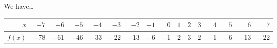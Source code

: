 \documentclass[11pt,letterpaper]{article}
\begin{document}
\sol We have\dots \par
	\begin{table}[!ht]
	\centering
	\begin{tabular}{r||rrrrrrrrrrrrrrr}
	$x$ & $-7$ & $-6$ & $-5$ & $-4$ & $-3$ & $-2$ & $-1$ & $0$ & $1$ & $2$ & $3$ & $4$& $5$ & $6$ & $7$ \\ \hline
	$f(x)$& $-78$ & $-61$ & $-46$ & $-33$ & $-22$ & $-13$ & $-6$ & $-1$ & $2$ & $3$ & $2$ & $-1$ & $-6$ & $-13$ & $-22$
	\end{tabular}
	\end{table}
\end{document}
